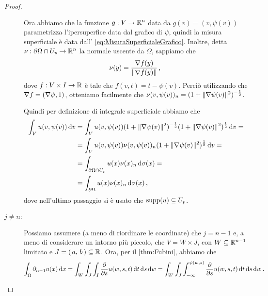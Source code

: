 \begin{proof}
\begin{description}
			Ora abbiamo che la funzione $g:V\rightarrow \mathbb R^n$ data da $g(v)=(v,\psi(v))$ parametrizza l'ipersuperfice data dal grafico di
			$\psi$, quindi la misura superficiale è data dall' \cref{eq:MisuraSuperficialeGrafico}.
			Inoltre, detta $\nu:\partial \Omega \cap U_p \rightarrow \mathbb R^n$ la normale uscente da $\Omega$, sappiamo che
			\begin{equation*}
				\nu(y)=\frac{\nabla f(y)}{\lVert \nabla f(y) \rVert}\, \text{, }
			\end{equation*}
			dove $f:V\times I\to\mathbb R$ è tale che $f(v,t)=t-\psi(v)$. Perciò utilizzando che $\nabla f=(\nabla \psi, 1)$, otteniamo facilmente che $\nu(v,\psi(v))_n=(1+\lVert\nabla\psi(v)\rVert^2)^{-\frac{1}{2}}$.
			
			Quindi per definizione di integrale superficiale abbiamo che
			\begin{align*}
				\int_V u(v,\psi(v)) \,\mathrm d v &= \int_V u(v,\psi(v)) (1+\lVert\nabla\psi(v)\rVert^2)^{-\frac{1}{2}} (1+\lVert\nabla\psi(v)\rVert^2)^{\frac{1}{2}} \,\mathrm d v = \\
				& = \int_V u(v,\psi(v)) \nu(v,\psi(v))_n (1+\lVert\nabla\psi(v)\rVert^2)^{\frac{1}{2}} \,\mathrm d v = \\
				& = \int_{\partial \Omega \cap U_p} u(x) \nu(x)_n \,\mathrm d \sigma(x) = \\
				& = \int_{\partial \Omega} u(x) \nu(x)_n \,\mathrm d \sigma(x)\, \text{, }
			\end{align*}
			dove nell'ultimo passaggio si è usato che $\operatorname{supp}(u)\subseteq U_p$.
		\item [$j\neq n$:] Possiamo assumere (a meno di riordinare le coordinate) che $j=n-1$ e, a meno di considerare un intorno più piccolo,
			che $V=W \times J$, con $W\subseteq \mathbb R^{n-1}$ limitato e $J=\left(\,a,\,b\,\right)\subseteq \mathbb R$. Ora, per il \cref{thm:Fubini}, abbiamo che
			\[
				\int_{\Omega} \partial_{n-1} u(x) \,\mathrm d x = \int_W \int_J \int_I \frac{\partial}{\partial s} u(w,s,t) \,\mathrm d t \,\mathrm d s \,\mathrm d w=\int_W \int_J \int_{-\infty}^{\psi(w,s)} \frac{\partial}{\partial s} u(w,s,t) \,\mathrm d t \,\mathrm d s \,\mathrm d w\, \text{. }
			\]
			

\end{description}
\end{proof}
